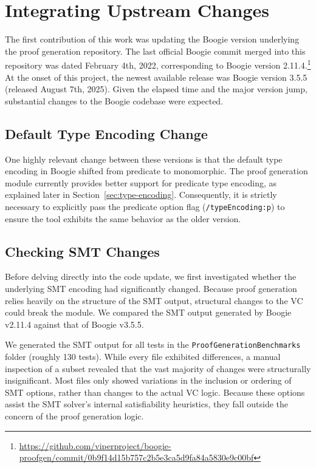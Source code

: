 \chapter{Integrating Upstream Changes}
\label{sec:upgrading-boogie}

The first contribution of this work was updating the Boogie version underlying the proof generation repository.
The last official Boogie commit merged into this repository was dated February 4th, 2022, corresponding to Boogie version 2.11.4.\footnote{\url{https://github.com/viperproject/boogie-proofgen/commit/0b9f14d15b757c2b5e3ca5d9fa84a5830e9c00bf}}
At the onset of this project, the newest available release was Boogie version 3.5.5 (released August 7th, 2025).
Given the elapsed time and the major version jump, substantial changes to the Boogie codebase were expected.

\section{Default Type Encoding Change}
\label{sec:default-type-encoding}

One highly relevant change between these versions is that the default type encoding in Boogie shifted from predicate to monomorphic.
The proof generation module currently provides better support for predicate type encoding,
as explained later in Section~\ref{sec:type-encoding}.
Consequently, it is strictly necessary to explicitly pass the predicate option flag (\lstinline[columns=fixed]{/typeEncoding:p})
to ensure the tool exhibits the same behavior as the older version.

\section{Checking SMT Changes}

Before delving directly into the code update, we first investigated whether the underlying SMT encoding had significantly changed.
Because proof generation relies heavily on the structure of the SMT output, structural changes to the VC could break the module.
We compared the SMT output generated by Boogie v2.11.4 against that of Boogie v3.5.5.

We generated the SMT output for all tests in the \texttt{ProofGenerationBenchmarks} folder (roughly 130 tests).
While every file exhibited differences, a manual inspection of a subset revealed that the vast majority of changes were structurally insignificant.
Most files only showed variations in the inclusion or ordering of SMT options, rather than changes to the actual VC logic.
Because these options assist the SMT solver's internal satisfiability heuristics, they fall outside the concern of the proof generation logic.

